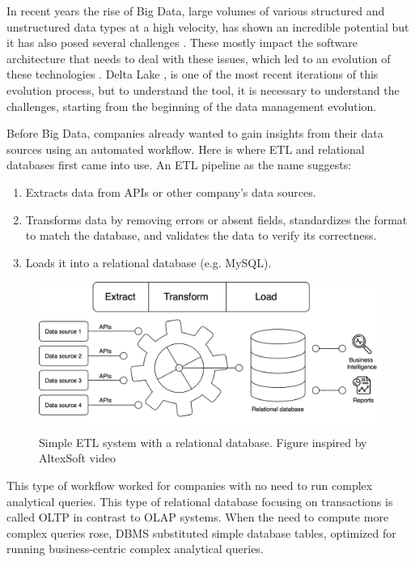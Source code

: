 In recent years the rise of Big Data, large volumes of various structured and unstructured data types at a high velocity, has shown an incredible potential but it has also posed several challenges \cite{penceWhatBigData2014}. These mostly impact the software architecture that needs to deal with these issues, which led to an evolution of these technologies \cite{gortonDistributionDataDeployment2015}. Delta Lake \cite{armbrustDeltaLakeHighperformance2020}, is one of the most recent iterations of this evolution process, but to understand the tool, it is necessary to understand the challenges, starting from the beginning of the data management evolution.

Before Big Data, companies already wanted to gain insights from their data sources using an automated workflow. Here is where \gls{ETL} and relational databases first came into use. An \gls{ETL} pipeline as the name suggests:
\begin{enumerate}
    \item Extracts data from \glspl{API} or other company's data sources.
    \item Transforms data by removing errors or absent fields, standardizes the format to match the database, and validates the data to verify its correctness.
    \item Loads it into a relational database (e.g. MySQL).
\end{enumerate} 

\begin{figure}[!ht]
    \begin{center}
      \includegraphics[width=\textwidth]{figures/2-background/DeltaLake_evolution-ETL+DB.png}
    \end{center}
    \caption{Simple \gls{ETL} system with a relational database. Figure inspired by AltexSoft video \cite{altexsoftHowDataEngineering2021}}
    \label{fig:ETL+DB}
\end{figure}

This type of workflow worked for companies with no need to run complex analytical queries. This type of relational database focusing on transactions is called \gls{OLTP} in contrast to \gls{OLAP} systems. When the need to compute more complex queries rose, \gls{DBMS} substituted simple database tables, optimized for running business-centric complex analytical queries.


